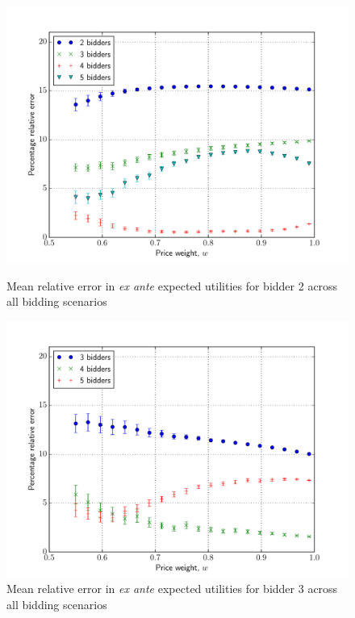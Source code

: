 \begin{figure}[p!]
  \includegraphics[width=\figsize]{Approximation/Figures/compare_bidder_2}
  \caption{Mean relative error in \emph{ex ante} expected utilities for bidder 2 across all bidding scenarios}
  \label{fig:compare_bidder_2_approximation}
  \vspace{10mm}
  \includegraphics[width=\figsize]{Approximation/Figures/compare_bidder_3}
  \caption{Mean relative error in \emph{ex ante} expected utilities for bidder 3 across all bidding scenarios}
  \label{fig:compare_bidder_3_approximation}
\end{figure}
